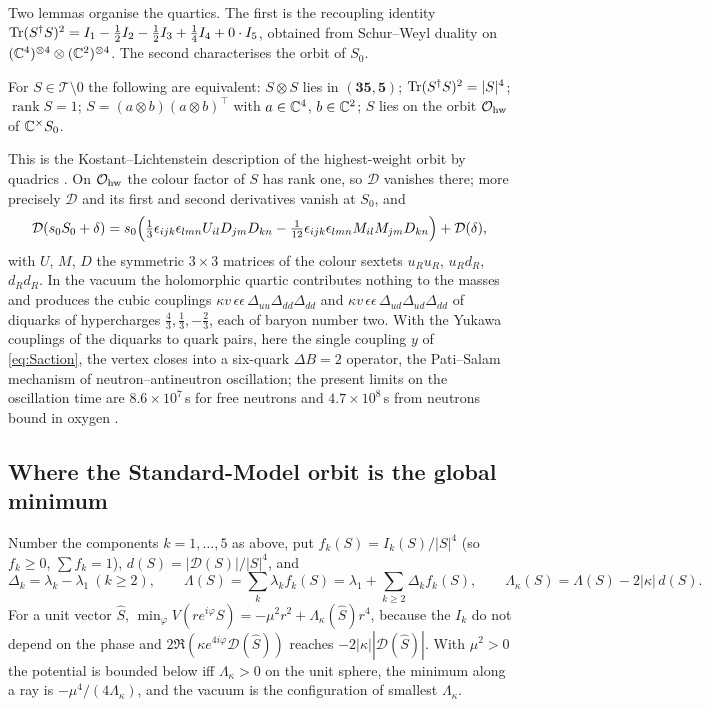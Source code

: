 Two lemmas organise the quartics. The first is the recoupling identity $\operatorname{Tr}(S^\dagger S)^2=I_1-\tfrac12I_2-\tfrac12I_3+\tfrac14I_4+0\cdot I_5$, obtained from
Schur--Weyl duality on $(\mathbb{C}^4)^{\otimes4}\otimes(\mathbb{C}^2)^{\otimes4}$. The second characterises the orbit of $S_0$.

\begin{lemma}
\label{lem:hw}
For $S\in\mathcal T\setminus0$ the following are equivalent: $S\otimes S$ lies in $(\mathbf{35},\mathbf5)$; $\operatorname{Tr}(S^\dagger S)^2=|S|^4$; $\operatorname{rank}S=1$;
$S=(a\otimes b)(a\otimes b)^{\!\top}$ with $a\in\mathbb{C}^4$, $b\in\mathbb{C}^2$; $S$ lies on the orbit $\mathcal O_{\rm hw}$ of $\mathbb{C}^\times S_0$.
\end{lemma}

This is the Kostant--Lichtenstein description of the highest-weight orbit by quadrics \cite{Lichtenstein82}. On $\mathcal O_{\rm hw}$ the colour factor of $S$
has rank one, so $\mathcal D$ vanishes there; more precisely $\mathcal D$ and its first and second derivatives vanish at $S_0$, and
\[
\mathcal D(s_0S_0+\delta)=s_0\Bigl(\tfrac13\epsilon_{ijk}\epsilon_{lmn}U_{il}D_{jm}D_{kn}-\tfrac1{12}\epsilon_{ijk}\epsilon_{lmn}M_{il}M_{jm}D_{kn}\Bigr)+\mathcal D(\delta),
\]
with $U$, $M$, $D$ the symmetric $3\times3$ matrices of the colour sextets $u_Ru_R$, $u_Rd_R$, $d_Rd_R$. In the vacuum the holomorphic quartic contributes
nothing to the masses and produces the cubic couplings $\kappa v\,\epsilon\epsilon\,\Delta_{uu}\Delta_{dd}\Delta_{dd}$ and $\kappa v\,\epsilon\epsilon\,\Delta_{ud}\Delta_{ud}\Delta_{dd}$ of
diquarks of hypercharges $\tfrac43,\tfrac13,-\tfrac23$, each of baryon number two. With the Yukawa couplings of the diquarks to quark pairs, here the
single coupling $y$ of \eqref{eq:Saction}, the vertex closes into a six-quark $\Delta B=2$ operator, the Pati--Salam mechanism of neutron--antineutron
oscillation; the present limits on the oscillation time are $8.6\times10^7$\,s for free neutrons \cite{BaldoCeolin94} and $4.7\times10^8$\,s from
neutrons bound in oxygen \cite{SuperK21}.

\subsection{Where the Standard-Model orbit is the global minimum}

Number the components $k=1,\dots,5$ as above, put $f_k(S)=I_k(S)/|S|^4$ (so $f_k\ge0$, $\sum f_k=1$), $d(S)=|\mathcal D(S)|/|S|^4$, and
\[
\Delta_k=\lambda_k-\lambda_1\ (k\ge2),\qquad \Lambda(S)=\sum_k\lambda_kf_k(S)=\lambda_1+\sum_{k\ge2}\Delta_kf_k(S),\qquad \Lambda_\kappa(S)=\Lambda(S)-2|\kappa|\,d(S).
\]
For a unit vector $\hat S$, $\min_\varphi V(re^{i\varphi}\hat S)=-\mu^2r^2+\Lambda_\kappa(\hat S)r^4$, because the $I_k$ do not depend on the phase and
$2\Re(\kappa e^{4i\varphi}\mathcal D(\hat S))$ reaches $-2|\kappa||\mathcal D(\hat S)|$. With $\mu^2>0$ the potential is bounded below iff $\Lambda_\kappa>0$ on the unit
sphere, the minimum along a ray is $-\mu^4/(4\Lambda_\kappa)$, and the vacuum is the configuration of smallest $\Lambda_\kappa$.

